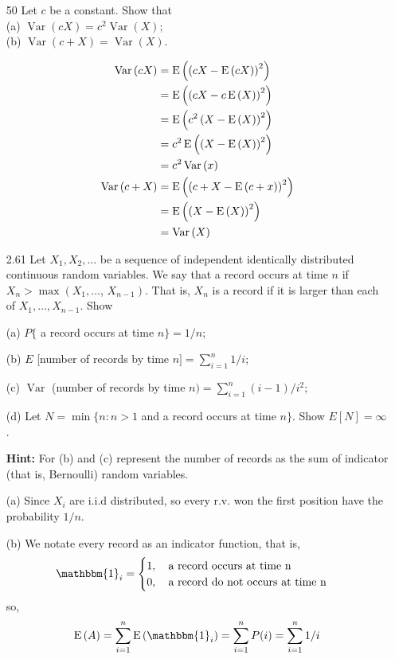 \documentclass[en,hazy,blue,12pt,device = normal]{elegantnote}
\newcommand{\idty}[1]{\mathbbm{1}_{#1}}
\begin{document}
\begin{enumerate}
    \item[50]Let $c$ be a constant. Show that\\
    (a) $\operatorname{Var}(c X)=c^2 \operatorname{Var}(X)$;\\
    (b) $\operatorname{Var}(c+X)=\operatorname{Var}(X)$.
    \begin{tcolorbox}
        \begin{align*}
            \operatorname{Var}\left(cX\right) &= \operatorname E\left(\left(cX - \operatorname E\left(cX\right)\right)^2\right) \\
            &=  \operatorname E\left(\left(cX - c\operatorname E\left(X\right)\right)^2\right) \\
            &= \operatorname E\left(c^2\left(X - \operatorname E\left(X\right)\right)^2\right) \\
            &= c^2\operatorname E\left(\left(X - \operatorname E\left(X\right)\right)^2\right) \\
            &= c^2\operatorname{Var}\left(x\right)\\
            \operatorname{Var}\left(c+X\right) &= \operatorname E\left(\left(c+X - \operatorname E\left(c+x\right)\right)^2\right)\\
            &= \operatorname E\left(\left(X-\operatorname E\left(X\right)\right)^2\right) \\
            &= \operatorname{Var}\left(X\right)
        \end{align*}
    \end{tcolorbox}

    \item[2.61] Let $X_1, X_2, \ldots$ be a sequence of independent identically distributed continuous random variables. We say that a record occurs at time $n$ if $X_n>\max \left(X_1, \ldots\right.$, $\left.X_{n-1}\right)$. That is, $X_n$ is a record if it is larger than each of $X_1, \ldots, X_{n-1}$. Show
    
    (a) $P\{$ a record occurs at time $n\}=1 / n$;

    (b) $E$ [number of records by time $n]=\sum_{i=1}^n 1 / i$;

    (c) $\operatorname{Var}$ (number of records by time $n)=\sum_{i=1}^n(i-1) / i^2$;

    (d) Let $N=\min \{n: n>1$ and a record occurs at time $n\}$. Show $E[N]=\infty$.

    {\bf Hint:} For (b) and (c) represent the number of records as the sum of indicator (that is, Bernoulli) random variables.

    \begin{tcolorbox}
        \sol

        (a) Since \(X_i\) are i.i.d distributed, so every r.v. won the first position have the probability \(1/n\).

        (b) We notate every record as an indicator function, that is,
        \begin{align*}
            \idty{i} = \begin{cases}
                1,\quad \text{a record occurs at time n}\\
                0,\quad \text{a record do not occurs at time n}
            \end{cases}
        \end{align*}
        so,
        \begin{align*}
            \mean{A} = \sumi \mean{\idty{i}} = \sumi P(i) = \sumi 1/i
        \end{align*}


\end{tcolorbox}
\end{enumerate}
\end{document}
